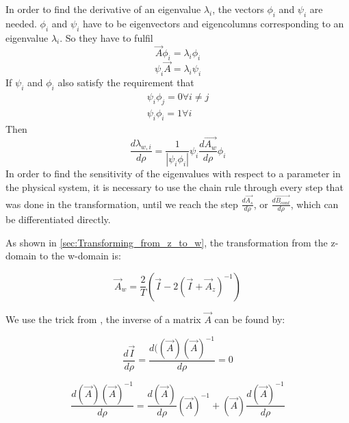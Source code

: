 In order to find the derivative of an eigenvalue $\lambda_i$, the vectors $\phi_i$ and $\psi_i$ are needed. $\phi_i$ and $\psi_i$ have to be eigenvectors and eigencolumns corresponding to an eigenvalue $\lambda_i$. So they have to fulfil
\begin{equation}
 \Vec{A}\phi_i = \lambda_i \phi_i
\end{equation}{}
\begin{equation}
\psi_i\Vec{A}= \lambda_i \psi_i
\end{equation}{}
If $\psi_i$ and $\phi_i$ also satisfy the requirement that 
\begin{align}
 \psi_i \phi_j = 0 \forall i \neq j \\
 \psi_i \phi_i = 1 \forall i
\end{align}{}
Then
\begin{equation}
 \frac{d \lambda_{w,i}}{d \rho} = \frac{1}{|\psi_i \phi_i|} \psi_i \frac{d \Vec{A_w}}{d \rho }\phi_i 
\end{equation}{}
In order to find the sensitivity of the eigenvalues with respect to a parameter in the physical system, it is necessary to use the chain rule through every step that was done in the transformation, until we reach the step $\frac{d \Vec{A_s}}{d \rho}$, or $\frac{d \Vec{B_{cont}}}{d \rho}$, which can be differentiated directly. 


As shown in \cref{sec:Transforming_from_z_to_w}, the transformation from the z-domain to the w-domain is: 

\begin{equation}
 \Vec{A}_w = \frac{2}{T} \left(\Vec{I} - 2( \Vec{I}+\Vec{A}_z)^{-1}\right)
\end{equation}{}

We use the trick from \cite{Matrix_differentiation_source}, the inverse of a matrix $\Vec{A}$ can be found by: 

\begin{equation}
 \frac{d \Vec{I}}{d \rho} = \frac{d ((\Vec{A})(\Vec{A})^{-1}}{d \rho} = 0
\end{equation}{}

\begin{equation}
 \frac{d (\Vec{A})(\Vec{A})^{-1}}{d \rho} = 
 \frac{d (\Vec{A})}{d \rho} (\Vec{A})^{-1} +
 (\Vec{A})\frac{d (\Vec{A})^{-1}}{d \rho}
\end{equation}{}

